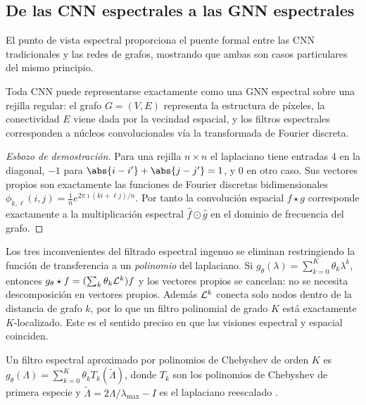 \subsection{De las CNN espectrales a las GNN espectrales}
\label{sec:graphs:cheb}

El punto de vista espectral proporciona el puente formal entre las CNN
tradicionales y las redes de grafos, mostrando que ambas son casos particulares
del mismo principio.

\begin{theorem}
\label{thm:graphs:cnn-spectral}
Toda CNN puede representarse exactamente como una GNN espectral sobre una rejilla
regular: el grafo $G = (V, E)$ representa la estructura de p\'ixeles, la
conectividad $E$ viene dada por la vecindad espacial, y los filtros espectrales
corresponden a n\'ucleos convolucionales v\'ia la transformada de Fourier
discreta.
\end{theorem}

\begin{proof}[Esbozo de demostraci\'on]
Para una rejilla $n \times n$ el laplaciano tiene entradas $4$ en la diagonal,
$-1$ para $\abs{i-i'}+\abs{j-j'} = 1$, y $0$ en otro caso. Sus vectores propios
son exactamente las funciones de Fourier discretas bidimensionales
$\phi_{k,\ell}(i,j) = \frac1n e^{2\pi\imath(ki+\ell j)/n}$. Por tanto la
convoluci\'on espacial $f \star g$ corresponde exactamente a la multiplicaci\'on
espectral $\hat f \odot \hat g$ en el dominio de frecuencia del grafo.
\end{proof}

Los tres inconvenientes del filtrado espectral ingenuo se eliminan restringiendo
la funci\'on de transferencia a un \emph{polinomio} del laplaciano. Si
$g_\theta(\lambda) = \sum_{k=0}^K \theta_k \lambda^k$, entonces
$g_\theta \star f = (\sum_k \theta_k \mathcal{L}^k) f$ y los vectores propios se cancelan:
no se necesita descomposici\'on en vectores propios. Adem\'as $\mathcal{L}^k$ conecta
solo nodos dentro de la distancia de grafo $k$, por lo que un filtro polinomial de
grado $K$ est\'a exactamente $K$-localizado. Este es el sentido preciso en que las
visiones espectral y espacial coinciden.

\begin{definition}
\label{def:graphs:chebnet}
Un filtro espectral aproximado por polinomios de Chebyshev de orden $K$ es
$g_\theta(\Lambda) = \sum_{k=0}^K \theta_k T_k(\tilde\Lambda)$, donde $T_k$ son los
polinomios de Chebyshev de primera especie y
$\tilde\Lambda = 2\Lambda/\lambda_{\max} - I$ es el laplaciano reescalado
\citep{defferrard2017convolutionalneuralnetworksgraphs}.
\end{definition}

